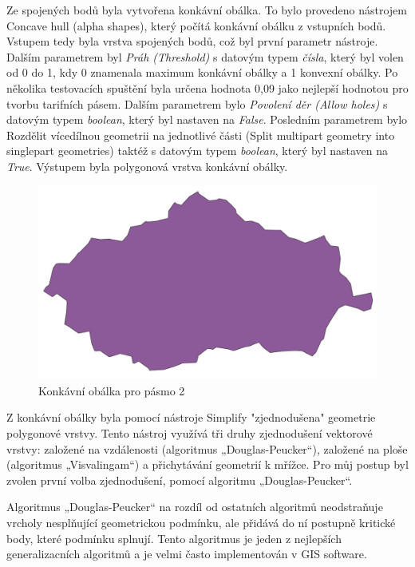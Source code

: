 Ze spojených bodů byla vytvořena konkávní obálka. To bylo provedeno nástrojem Concave hull (alpha shapes),
který počítá konkávní obálku z vstupních bodů. Vstupem tedy byla vrstva spojených bodů, což byl první parametr
nástroje. Dalším parametrem byl \textit{Práh (Threshold)} s datovým typem \textit{čísla}, který byl volen od 0 do 1,
kdy 0 znamenala maximum konkávní obálky a 1 konvexní obálky. Po několika testovacích spuštění byla 
určena hodnota 0,09 jako nejlepší hodnotou pro tvorbu tarifních pásem. Dalším parametrem bylo \textit{Povolení děr (Allow holes)} 
s datovým typem \textit{boolean}, který byl nastaven na \textit{False}.
Posledním parametrem bylo Rozdělit vícedílnou geometrii na jednotlivé části (Split multipart geometry 
into singlepart geometries) taktéž s datovým typem \textit{boolean}, který byl nastaven na \textit{True}.  
Výstupem byla polygonová vrstva konkávní obálky. 

\begin{figure}[H] \centering
    \includegraphics[width=400pt]{./pictures/concaveHull.png}
    \caption[Konkávní obálka pro pásmo 2]{Konkávní obálka pro pásmo 2}
	\label{fig:concaveHull}              
\end{figure} 

Z konkávní obálky byla pomocí nástroje Simplify "zjednodušena" geometrie polygonové vrstvy. Tento nástroj
využívá tři druhy zjednodušení vektorové vrstvy: založené na vzdálenosti (algoritmus „Douglas-Peucker“),
založené na ploše (algoritmus „Visvalingam“) a přichytávání geometrií k mřížce.
Pro můj postup byl zvolen první volba zjednodušení, pomocí algoritmu „Douglas-Peucker“.

Algoritmus „Douglas-Peucker“ na rozdíl od ostatních algoritmů neodstraňuje vrcholy nesplňující 
geometrickou podmínku, ale přidává do ní postupně kritické body, které podmínku splnují.
Tento algoritmus je jeden z nejlepších generalizacních algoritmů a je velmi často
implementován v GIS software. \cite{bayer-douglas}

